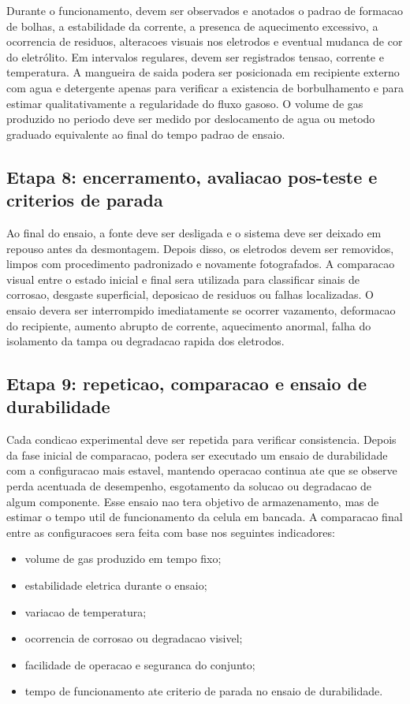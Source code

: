 \documentclass[12pt,oneside,a4paper,brazilian]{abntex2}
\begin{document}
Durante o funcionamento, devem ser observados e anotados o padrao de formacao de bolhas, a estabilidade da corrente, a presenca de aquecimento excessivo, a ocorrencia de residuos, alteracoes visuais nos eletrodos e eventual mudanca de cor do eletrólito. Em intervalos regulares, devem ser registrados tensao, corrente e temperatura. A mangueira de saida podera ser posicionada em recipiente externo com agua e detergente apenas para verificar a existencia de borbulhamento e para estimar qualitativamente a regularidade do fluxo gasoso. O volume de gas produzido no periodo deve ser medido por deslocamento de agua ou metodo graduado equivalente ao final do tempo padrao de ensaio.

\subsection{Etapa 8: encerramento, avaliacao pos-teste e criterios de parada}

Ao final do ensaio, a fonte deve ser desligada e o sistema deve ser deixado em repouso antes da desmontagem. Depois disso, os eletrodos devem ser removidos, limpos com procedimento padronizado e novamente fotografados. A comparacao visual entre o estado inicial e final sera utilizada para classificar sinais de corrosao, desgaste superficial, deposicao de residuos ou falhas localizadas. O ensaio devera ser interrompido imediatamente se ocorrer vazamento, deformacao do recipiente, aumento abrupto de corrente, aquecimento anormal, falha do isolamento da tampa ou degradacao rapida dos eletrodos.

\subsection{Etapa 9: repeticao, comparacao e ensaio de durabilidade}

Cada condicao experimental deve ser repetida para verificar consistencia. Depois da fase inicial de comparacao, podera ser executado um ensaio de durabilidade com a configuracao mais estavel, mantendo operacao continua ate que se observe perda acentuada de desempenho, esgotamento da solucao ou degradacao de algum componente. Esse ensaio nao tera objetivo de armazenamento, mas de estimar o tempo util de funcionamento da celula em bancada. A comparacao final entre as configuracoes sera feita com base nos seguintes indicadores:

\begin{itemize}
  \item volume de gas produzido em tempo fixo;
  \item estabilidade eletrica durante o ensaio;
  \item variacao de temperatura;
  \item ocorrencia de corrosao ou degradacao visivel;
  \item facilidade de operacao e seguranca do conjunto;
  \item tempo de funcionamento ate criterio de parada no ensaio de durabilidade.
\end{itemize}
\end{document}
